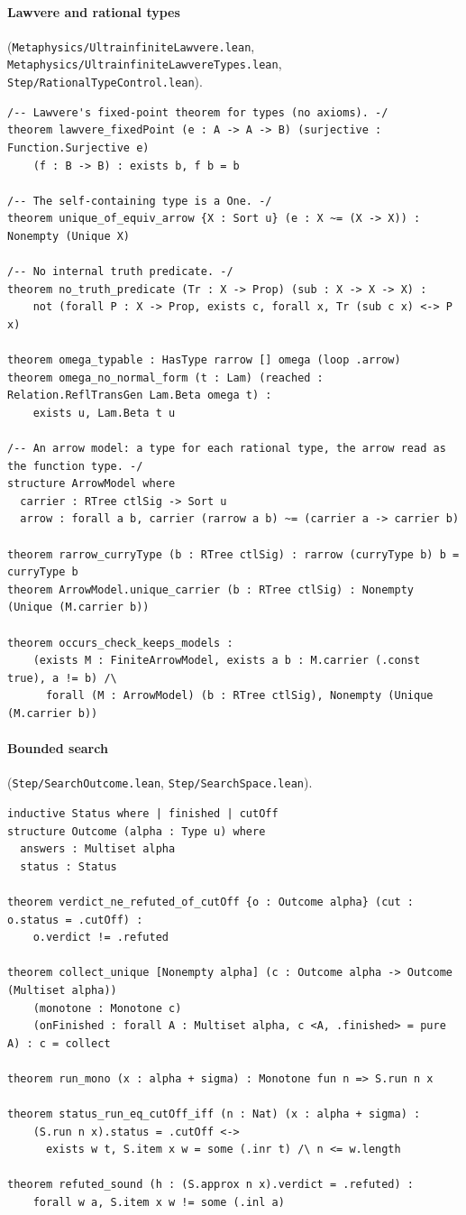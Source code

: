 \documentclass[]{article}
\theoremstyle{definition}
\theoremstyle{remark}
\newcommand{\lpath}[1]{{\ttfamily\nolinkurl{#1}}}
\newcommand{\meta}[1]{\lpath{Metaphysics/#1.lean}}
\newcommand{\step}[1]{\lpath{Step/#1.lean}}
\begin{document}
\paragraph{Lawvere and rational types} (\meta{UltrainfiniteLawvere}, \meta{UltrainfiniteLawvereTypes},
\step{RationalTypeControl}).
\begin{lstlisting}
/-- Lawvere's fixed-point theorem for types (no axioms). -/
theorem lawvere_fixedPoint (e : A -> A -> B) (surjective : Function.Surjective e)
    (f : B -> B) : exists b, f b = b

/-- The self-containing type is a One. -/
theorem unique_of_equiv_arrow {X : Sort u} (e : X ~= (X -> X)) : Nonempty (Unique X)

/-- No internal truth predicate. -/
theorem no_truth_predicate (Tr : X -> Prop) (sub : X -> X -> X) :
    not (forall P : X -> Prop, exists c, forall x, Tr (sub c x) <-> P x)

theorem omega_typable : HasType rarrow [] omega (loop .arrow)
theorem omega_no_normal_form (t : Lam) (reached : Relation.ReflTransGen Lam.Beta omega t) :
    exists u, Lam.Beta t u

/-- An arrow model: a type for each rational type, the arrow read as the function type. -/
structure ArrowModel where
  carrier : RTree ctlSig -> Sort u
  arrow : forall a b, carrier (rarrow a b) ~= (carrier a -> carrier b)

theorem rarrow_curryType (b : RTree ctlSig) : rarrow (curryType b) b = curryType b
theorem ArrowModel.unique_carrier (b : RTree ctlSig) : Nonempty (Unique (M.carrier b))

theorem occurs_check_keeps_models :
    (exists M : FiniteArrowModel, exists a b : M.carrier (.const true), a != b) /\
      forall (M : ArrowModel) (b : RTree ctlSig), Nonempty (Unique (M.carrier b))
\end{lstlisting}

\paragraph{Bounded search} (\step{SearchOutcome}, \step{SearchSpace}).
\begin{lstlisting}
inductive Status where | finished | cutOff
structure Outcome (alpha : Type u) where
  answers : Multiset alpha
  status : Status

theorem verdict_ne_refuted_of_cutOff {o : Outcome alpha} (cut : o.status = .cutOff) :
    o.verdict != .refuted

theorem collect_unique [Nonempty alpha] (c : Outcome alpha -> Outcome (Multiset alpha))
    (monotone : Monotone c)
    (onFinished : forall A : Multiset alpha, c <A, .finished> = pure A) : c = collect

theorem run_mono (x : alpha + sigma) : Monotone fun n => S.run n x

theorem status_run_eq_cutOff_iff (n : Nat) (x : alpha + sigma) :
    (S.run n x).status = .cutOff <->
      exists w t, S.item x w = some (.inr t) /\ n <= w.length

theorem refuted_sound (h : (S.approx n x).verdict = .refuted) :
    forall w a, S.item x w != some (.inl a)
\end{lstlisting}
\end{document}
